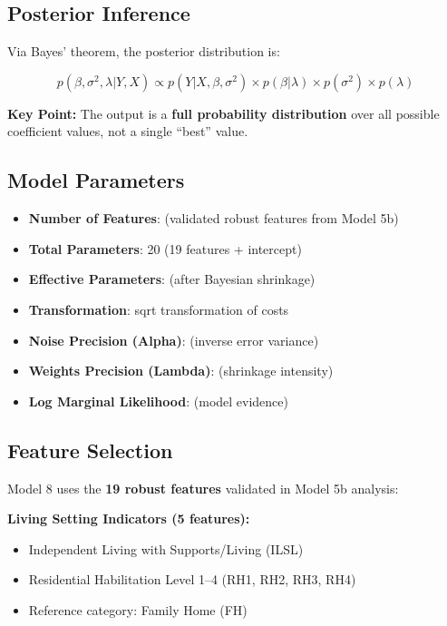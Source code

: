 \subsection{Posterior Inference}

Via Bayes' theorem, the posterior distribution is:

\begin{equation}
p(\beta, \sigma^2, \lambda | Y, X) \propto p(Y | X, \beta, \sigma^2) \times p(\beta | \lambda) \times p(\sigma^2) \times p(\lambda)
\end{equation}

\textbf{Key Point:} The output is a \textbf{full probability distribution} over all possible coefficient values, not a single ``best'' value.

\subsection{Model Parameters}

\begin{itemize}
    \item \textbf{Number of Features}: \ModelEightNRobustFeatures{} (validated robust features from Model 5b)
    \item \textbf{Total Parameters}: 20 (19 features + intercept)
    \item \textbf{Effective Parameters}: \ModelEightEffectiveParams{} (after Bayesian shrinkage)
    \item \textbf{Transformation}: sqrt transformation of costs
    \item \textbf{Noise Precision (Alpha)}: \ModelEightAlpha{} (inverse error variance)
    \item \textbf{Weights Precision (Lambda)}: \ModelEightLambda{} (shrinkage intensity)
    \item \textbf{Log Marginal Likelihood}: \ModelEightLogMarginalLikelihood{} (model evidence)
\end{itemize}

\subsection{Feature Selection}

Model 8 uses the \textbf{19 robust features} validated in Model 5b analysis:

\textbf{Living Setting Indicators (5 features):}
\begin{itemize}
    \item Independent Living with Supports/Living (ILSL)
    \item Residential Habilitation Level 1--4 (RH1, RH2, RH3, RH4)
    \item Reference category: Family Home (FH)
\end{itemize}

